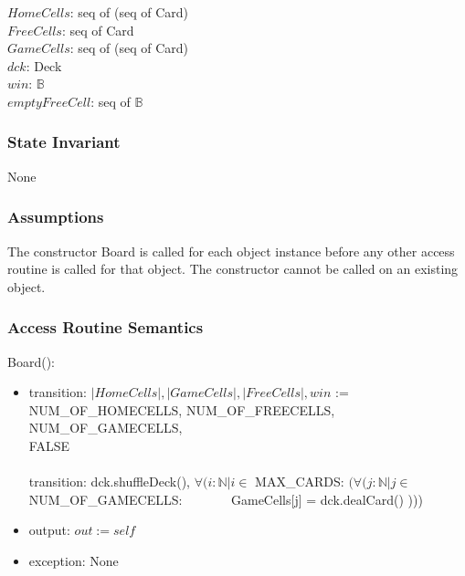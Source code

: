 \documentclass[12pt]{article}
\begin{document}
$HomeCells$: seq of (seq of Card)\\
$FreeCells$: seq of Card\\
$GameCells$: seq of (seq of Card)\\ 
$dck$: Deck\\
$win$: $\mathbb{B}$\\
$emptyFreeCell$: seq of $\mathbb{B}$

\subsubsection* {State Invariant}

None

\subsubsection* {Assumptions}

The constructor Board is called for each object instance before any other
access routine is called for that object.  The constructor cannot be called on
an existing object.

\subsubsection* {Access Routine Semantics}

Board():
\begin{itemize}
\item transition: $|HomeCells|, |GameCells|, |FreeCells|, win $ :=  \\NUM\_OF\_HOMECELLS, NUM\_OF\_FREECELLS, NUM\_OF\_GAMECELLS,\\ FALSE\\\\
transition: dck.shuffleDeck(), $\forall (i : \mathbb{N} | i \in$ MAX\_CARDS: $(\forall ( j : \mathbb{N} | j \in$  NUM\_OF\_GAMECELLS: \,\,\,\,\,\,\,\,\,\,\,\,\,\,\,\,\,\,\, GameCells[j] = dck.dealCard() ))) 
 
\item output: $out := \mathit{self}$
\item exception: None
\end{itemize}
\end{document}
